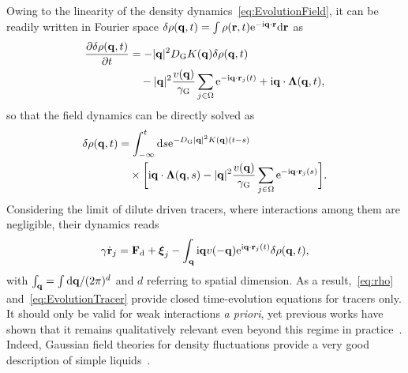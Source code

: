 \documentclass[superscriptaddress, twocolumn, prx, longbibliography, nofootinbib]{revtex4-1}
\newcommand{\dd}{\text{d}}
\newcommand{\ee}{\text{e}}
\newcommand{\ii}{\text{i}}
\begin{document}
Owing to the linearity of the density dynamics~\eqref{eq:EvolutionField}, it can be readily written in Fourier space $\delta\rho({\bf q},t)=\int\rho({\bf r},t){\rm e}^{-{\rm i}{\bf q}\cdot{\bf r}} {\rm d}{\bf r}$ as
\begin{equation}\label{eq:FourierEvolutionField}
	\begin{aligned}
		\frac{\partial \delta \rho({\bf q},t)}{\partial t} &= - |{\bf q}|^2 D_{\rm G} K({\bf q}) \delta \rho({\bf q},t)
		\\
		&\quad - |{\bf q}|^2 \frac{v({\bf q})}{\gamma_{\rm G}} \sum_{j\in\Omega}\ee^{-\ii {\bf q} \cdot {\bf r}_j(t)} + \ii{\bf q}\cdot{\boldsymbol\Lambda} ({\bf q},t) ,
	\end{aligned}
\end{equation}
so that the field dynamics can be directly solved as
\begin{equation}\label{eq:rho}
	\begin{aligned}
		\delta\rho({\bf q},t) &= \int_{-\infty}^t \dd s \ee^{-D_{\rm G} |{\bf q}|^2 K({\bf q})(t-s)}
		\\
		&\quad\times \bigg[ \ii{\bf q} \cdot {\boldsymbol\Lambda}({\bf q},s) - |{\bf q}|^2 \frac{v({\bf q})}{\gamma_{\rm G}} \sum_{j\in\Omega}\ee^{-\ii {\bf q}\cdot {\bf r}_j(s)}\bigg] .
	\end{aligned}
\end{equation}
Considering the limit of dilute driven tracers, where interactions among them are negligible, their dynamics reads
\begin{equation}\label{eq:EvolutionTracer}
	\gamma\dot{\bf r}_j = {\bf F}_\text{d} + {\boldsymbol\xi_j} - \int_{\bf q} \ii{\bf q} v(-{\bf q})\ee^{\ii{\bf q} \cdot {\bf r}_j(t)} \delta \rho({\bf q}, t) ,
\end{equation}
with $\int_{\bf q}=\int\dd{\bf q}/(2\pi)^d$ and $d$ referring to spatial dimension. As a result,~\eqref{eq:rho} and~\eqref{eq:EvolutionTracer} provide closed time-evolution equations for tracers only. It should only be valid for weak interactions {\it a priori}, yet previous works have shown that it remains qualitatively relevant even beyond this regime in practice~\cite{Demery2015, Martin2018}. Indeed, Gaussian field theories for density fluctuations provide a very good description of simple liquids~\cite{Chandler1993}.
\end{document}
